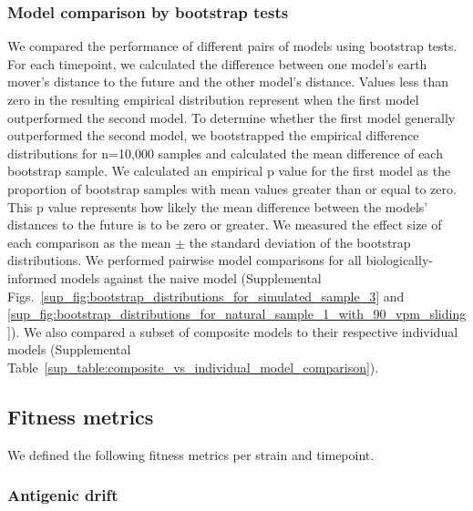 \subsubsection*{Model comparison by bootstrap tests}

We compared the performance of different pairs of models using bootstrap tests.
For each timepoint, we calculated the difference between one model's earth mover's distance to the future and the other model's distance.
Values less than zero in the resulting empirical distribution represent when the first model outperformed the second model.
To determine whether the first model generally outperformed the second model, we bootstrapped the empirical difference distributions for n=10,000 samples and calculated the mean difference of each bootstrap sample.
We calculated an empirical p value for the first model as the proportion of bootstrap samples with mean values greater than or equal to zero.
This p value represents how likely the mean difference between the models' distances to the future is to be zero or greater.
We measured the effect size of each comparison as the mean $\pm$ the standard deviation of the bootstrap distributions.
We performed pairwise model comparisons for all biologically-informed models against the naive model (Supplemental Figs.~\ref{sup_fig:bootstrap_distributions_for_simulated_sample_3} and \ref{sup_fig:bootstrap_distributions_for_natural_sample_1_with_90_vpm_sliding}).
We also compared a subset of composite models to their respective individual models (Supplemental Table~\ref{sup_table:composite_vs_individual_model_comparison}).

\subsection*{Fitness metrics}

We defined the following fitness metrics per strain and timepoint.

\subsubsection*{Antigenic drift}

